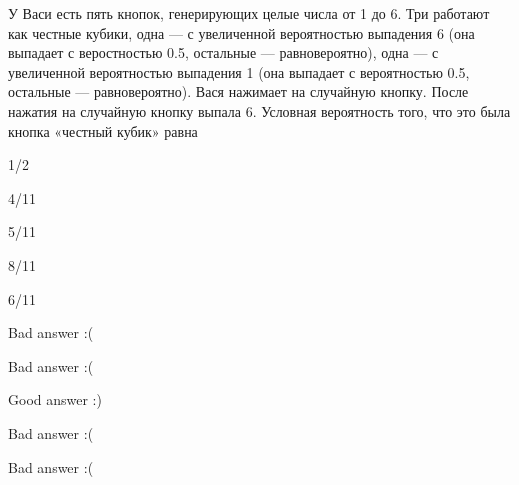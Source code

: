 
\begin{question}
У Васи есть пять кнопок, генерирующих целые числа от 1 до 6. Три
работают как честные кубики, одна --- с увеличенной вероятностью
выпадения 6 (она выпадает с веростностью 0.5, остальные ---
равновероятно), одна --- с увеличенной вероятностью выпадения 1 (она
выпадает с вероятностью 0.5, остальные --- равновероятно). Вася нажимает
на случайную кнопку. После нажатия на случайную кнопку выпала 6.
Условная вероятность того, что это была кнопка «честный кубик» равна
\begin{answerlist}
  \item 1/2
  \item 4/11
  \item 5/11
  \item 8/11
  \item 6/11
\end{answerlist}
\end{question}

\begin{solution}
\begin{answerlist}
  \item Bad answer :(
  \item Bad answer :(
  \item Good answer :)
  \item Bad answer :(
  \item Bad answer :(
\end{answerlist}
\end{solution}

